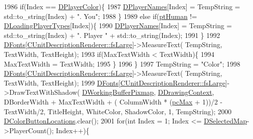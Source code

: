 \begin{DoxyCode}
1986         \textcolor{keywordflow}{if}(Index == \hyperlink{classCApplicationData_a53550939b20cba70570f113e4d1c5d02}{DPlayerColor})\{
1987             \hyperlink{classCApplicationData_a446d88c378b95b1a4f88071612229086}{DPlayerNames}[Index] = TempString = std::to\_string(Index) + \textcolor{stringliteral}{". You"};   
1988         \}
1989         \textcolor{keywordflow}{else} \textcolor{keywordflow}{if}(\hyperlink{classCApplicationData_ae04b6b340297311972ce1e955196fcaaaf06f9bc64db8860bc03ecc330b11f234}{ptHuman} != \hyperlink{classCApplicationData_a2ac5711b027842d57aa5f8e5a7adc589}{DLoadingPlayerTypes}[Index])\{
1990             \hyperlink{classCApplicationData_a446d88c378b95b1a4f88071612229086}{DPlayerNames}[Index] = TempString = std::to\_string(Index) + \textcolor{stringliteral}{". Player "} + 
      std::to\_string(Index);   
1991         \}
1992         \hyperlink{classCApplicationData_afde9247d0a3ea87393ec86dcdb1e8274}{DFonts}[\hyperlink{classCUnitDescriptionRenderer_a3ea4cd83b6dd9533ab3abb953a7da35aaf467097fe4f4811a5e2f1959c86e071d}{CUnitDescriptionRenderer::fsLarge}]->MeasureText(
      TempString, TextWidth, TextHeight);
1993         \textcolor{keywordflow}{if}(MaxTextWidth < TextWidth)\{
1994             MaxTextWidth = TextWidth;   
1995         \}
1996     \}
1997     TempString = \textcolor{stringliteral}{"Color"};
1998     \hyperlink{classCApplicationData_afde9247d0a3ea87393ec86dcdb1e8274}{DFonts}[\hyperlink{classCUnitDescriptionRenderer_a3ea4cd83b6dd9533ab3abb953a7da35aaf467097fe4f4811a5e2f1959c86e071d}{CUnitDescriptionRenderer::fsLarge}]->MeasureText(
      TempString, TextWidth, TextHeight);
1999     \hyperlink{classCApplicationData_afde9247d0a3ea87393ec86dcdb1e8274}{DFonts}[\hyperlink{classCUnitDescriptionRenderer_a3ea4cd83b6dd9533ab3abb953a7da35aaf467097fe4f4811a5e2f1959c86e071d}{CUnitDescriptionRenderer::fsLarge}]->DrawTextWithShadow(
      \hyperlink{classCApplicationData_afa34cf2780f38dd28c0c811e69d60a97}{DWorkingBufferPixmap}, \hyperlink{classCApplicationData_aa6c5bea9bdcc64398e5a3f693661d37c}{DDrawingContext}, DBorderWidth + MaxTextWidth + (
      ColumnWidth * (\hyperlink{GameDataTypes_8h_aafb0ca75933357ff28a6d7efbdd7602fa594a5c8dd3987f24e8a0f23f1a72cd34}{pcMax} + 1))/2 - TextWidth/2, TitleHeight, WhiteColor, ShadowColor, 1, TempString);
2000     \hyperlink{classCApplicationData_ac983034ed6e3eec382e22f1d2af25106}{DColorButtonLocations}.clear();
2001     \textcolor{keywordflow}{for}(\textcolor{keywordtype}{int} Index = 1; Index <= \hyperlink{classCApplicationData_abf74a18394e479b7090a8f9a55608867}{DSelectedMap}->PlayerCount(); Index++)\{

\end{DoxyCode}
